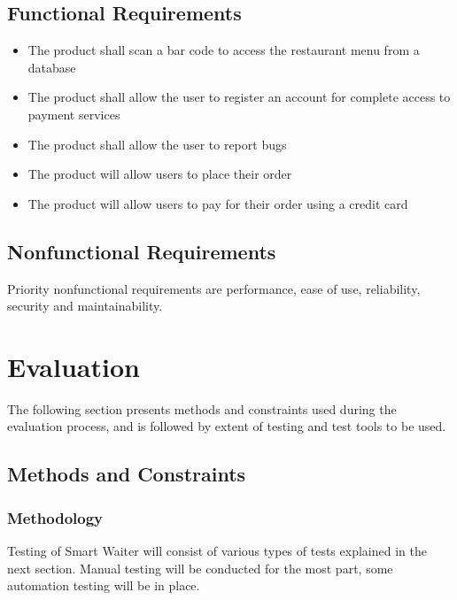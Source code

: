 \documentclass[12pt]{article}
\begin{document}
\subsection{Functional Requirements}

\noindent
\begin{itemize}
\item The product shall scan a bar code to access the restaurant menu from a database
\item The product shall allow the user to register an account for complete access to payment services
\item The product shall allow the user to report bugs
\item The product will allow users to place their order
\item The product will allow users to pay for their order using a credit card
\end{itemize}  

\subsection{Nonfunctional Requirements}
Priority nonfunctional requirements are performance, ease of use, reliability, security and maintainability.


%
%

\section{Evaluation}

The following section presents methods and constraints used during the evaluation process, and is followed by extent of testing and test tools to be used.

\subsection{ Methods and Constraints} 

\subsubsection{Methodology} 
Testing of Smart Waiter will consist of various types of tests explained in the next section. Manual testing will be conducted for the most part, some automation testing will be in place.
\end{document}
